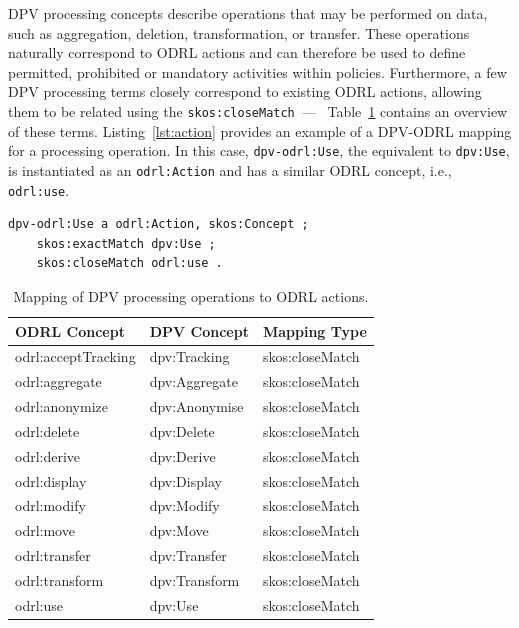 DPV processing concepts describe
operations that may be performed on data,
such as aggregation, deletion, transformation, or transfer.
These operations naturally correspond to ODRL actions and
can therefore be used to define
permitted, prohibited or mandatory activities within policies.
Furthermore, 
a few DPV processing terms closely correspond to existing ODRL actions,
allowing them to be related using the \texttt{skos:closeMatch}~---~%
Table~\ref{tab:processing} contains an overview of these terms.
Listing~\ref{lst:action} provides an example of a
DPV-ODRL mapping for a processing operation.
In this case,
\texttt{dpv-odrl:Use},
the equivalent to \texttt{dpv:Use},
is instantiated as an \texttt{odrl:Action} and
has a similar ODRL concept, i.e., \texttt{odrl:use}.

\begin{scriptsize}
\begin{lstlisting}[language=turtle, caption=DPV-ODRL mapping for the Use concept., label=lst:action]
dpv-odrl:Use a odrl:Action, skos:Concept ;
	skos:exactMatch dpv:Use ;
	skos:closeMatch odrl:use .
\end{lstlisting}
\end{scriptsize}

\begin{table}[ht]
    \centering
    \caption{Mapping of DPV processing operations to ODRL actions.}
    \label{tab:processing}
    \begin{tabular}{lll}
        \toprule
        \textbf{ODRL Concept} & \textbf{DPV Concept} & \textbf{Mapping Type} \\
        \midrule
        odrl:acceptTracking & dpv:Tracking & skos:closeMatch \\
        odrl:aggregate & dpv:Aggregate & skos:closeMatch \\
        odrl:anonymize & dpv:Anonymise & skos:closeMatch \\
        odrl:delete & dpv:Delete & skos:closeMatch \\
        odrl:derive & dpv:Derive & skos:closeMatch \\
        odrl:display & dpv:Display & skos:closeMatch \\
        odrl:modify & dpv:Modify & skos:closeMatch \\
        odrl:move & dpv:Move & skos:closeMatch \\
        odrl:transfer & dpv:Transfer & skos:closeMatch \\
        odrl:transform & dpv:Transform & skos:closeMatch \\
        odrl:use & dpv:Use & skos:closeMatch \\
        \bottomrule
    \end{tabular}
\end{table}

